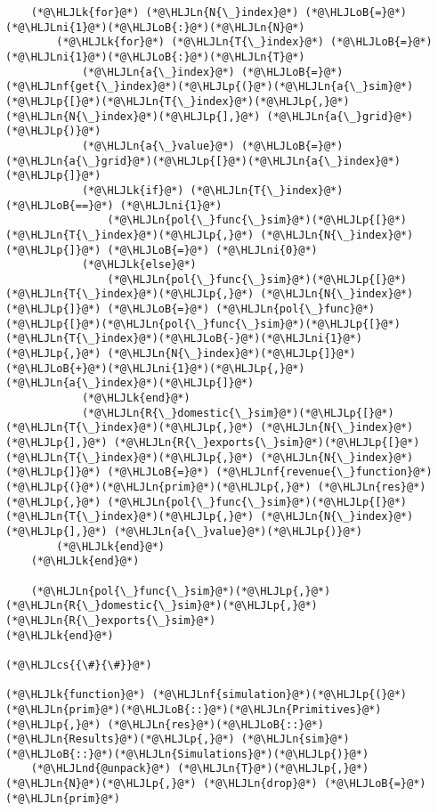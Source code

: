 \documentclass[12pt,a4paper]{article}
\newcommand{\HLJLk}[1]{\textcolor[RGB]{148,91,176}{\textbf{#1}}}
\newcommand{\HLJLn}[1]{#1}
\newcommand{\HLJLnd}[1]{\textcolor[RGB]{214,102,97}{#1}}
\newcommand{\HLJLnf}[1]{\textcolor[RGB]{66,102,213}{#1}}
\newcommand{\HLJLni}[1]{\textcolor[RGB]{59,151,46}{#1}}
\newcommand{\HLJLoB}[1]{\textcolor[RGB]{102,102,102}{\textbf{#1}}}
\newcommand{\HLJLp}[1]{#1}
\newcommand{\HLJLcs}[1]{\textcolor[RGB]{153,153,119}{\textit{#1}}}
\begin{document}
\begin{lstlisting}
    (*@\HLJLk{for}@*) (*@\HLJLn{N{\_}index}@*) (*@\HLJLoB{=}@*) (*@\HLJLni{1}@*)(*@\HLJLoB{:}@*)(*@\HLJLn{N}@*)
        (*@\HLJLk{for}@*) (*@\HLJLn{T{\_}index}@*) (*@\HLJLoB{=}@*) (*@\HLJLni{1}@*)(*@\HLJLoB{:}@*)(*@\HLJLn{T}@*)
            (*@\HLJLn{a{\_}index}@*) (*@\HLJLoB{=}@*) (*@\HLJLnf{get{\_}index}@*)(*@\HLJLp{(}@*)(*@\HLJLn{a{\_}sim}@*)(*@\HLJLp{[}@*)(*@\HLJLn{T{\_}index}@*)(*@\HLJLp{,}@*) (*@\HLJLn{N{\_}index}@*)(*@\HLJLp{],}@*) (*@\HLJLn{a{\_}grid}@*)(*@\HLJLp{)}@*)
            (*@\HLJLn{a{\_}value}@*) (*@\HLJLoB{=}@*) (*@\HLJLn{a{\_}grid}@*)(*@\HLJLp{[}@*)(*@\HLJLn{a{\_}index}@*)(*@\HLJLp{]}@*)
            (*@\HLJLk{if}@*) (*@\HLJLn{T{\_}index}@*) (*@\HLJLoB{==}@*) (*@\HLJLni{1}@*)
                (*@\HLJLn{pol{\_}func{\_}sim}@*)(*@\HLJLp{[}@*)(*@\HLJLn{T{\_}index}@*)(*@\HLJLp{,}@*) (*@\HLJLn{N{\_}index}@*)(*@\HLJLp{]}@*) (*@\HLJLoB{=}@*) (*@\HLJLni{0}@*)
            (*@\HLJLk{else}@*)
                (*@\HLJLn{pol{\_}func{\_}sim}@*)(*@\HLJLp{[}@*)(*@\HLJLn{T{\_}index}@*)(*@\HLJLp{,}@*) (*@\HLJLn{N{\_}index}@*)(*@\HLJLp{]}@*) (*@\HLJLoB{=}@*) (*@\HLJLn{pol{\_}func}@*)(*@\HLJLp{[}@*)(*@\HLJLn{pol{\_}func{\_}sim}@*)(*@\HLJLp{[}@*)(*@\HLJLn{T{\_}index}@*)(*@\HLJLoB{-}@*)(*@\HLJLni{1}@*)(*@\HLJLp{,}@*) (*@\HLJLn{N{\_}index}@*)(*@\HLJLp{]}@*)(*@\HLJLoB{+}@*)(*@\HLJLni{1}@*)(*@\HLJLp{,}@*) (*@\HLJLn{a{\_}index}@*)(*@\HLJLp{]}@*)
            (*@\HLJLk{end}@*)
            (*@\HLJLn{R{\_}domestic{\_}sim}@*)(*@\HLJLp{[}@*)(*@\HLJLn{T{\_}index}@*)(*@\HLJLp{,}@*) (*@\HLJLn{N{\_}index}@*)(*@\HLJLp{],}@*) (*@\HLJLn{R{\_}exports{\_}sim}@*)(*@\HLJLp{[}@*)(*@\HLJLn{T{\_}index}@*)(*@\HLJLp{,}@*) (*@\HLJLn{N{\_}index}@*)(*@\HLJLp{]}@*) (*@\HLJLoB{=}@*) (*@\HLJLnf{revenue{\_}function}@*)(*@\HLJLp{(}@*)(*@\HLJLn{prim}@*)(*@\HLJLp{,}@*) (*@\HLJLn{res}@*)(*@\HLJLp{,}@*) (*@\HLJLn{pol{\_}func{\_}sim}@*)(*@\HLJLp{[}@*)(*@\HLJLn{T{\_}index}@*)(*@\HLJLp{,}@*) (*@\HLJLn{N{\_}index}@*)(*@\HLJLp{],}@*) (*@\HLJLn{a{\_}value}@*)(*@\HLJLp{)}@*)
        (*@\HLJLk{end}@*)
    (*@\HLJLk{end}@*)

    (*@\HLJLn{pol{\_}func{\_}sim}@*)(*@\HLJLp{,}@*) (*@\HLJLn{R{\_}domestic{\_}sim}@*)(*@\HLJLp{,}@*) (*@\HLJLn{R{\_}exports{\_}sim}@*)
(*@\HLJLk{end}@*)

(*@\HLJLcs{{\#}{\#}}@*)

(*@\HLJLk{function}@*) (*@\HLJLnf{simulation}@*)(*@\HLJLp{(}@*)(*@\HLJLn{prim}@*)(*@\HLJLoB{::}@*)(*@\HLJLn{Primitives}@*)(*@\HLJLp{,}@*) (*@\HLJLn{res}@*)(*@\HLJLoB{::}@*)(*@\HLJLn{Results}@*)(*@\HLJLp{,}@*) (*@\HLJLn{sim}@*)(*@\HLJLoB{::}@*)(*@\HLJLn{Simulations}@*)(*@\HLJLp{)}@*)
    (*@\HLJLnd{@unpack}@*) (*@\HLJLn{T}@*)(*@\HLJLp{,}@*) (*@\HLJLn{N}@*)(*@\HLJLp{,}@*) (*@\HLJLn{drop}@*) (*@\HLJLoB{=}@*) (*@\HLJLn{prim}@*)


\end{lstlisting}
\end{document}
